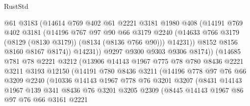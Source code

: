 \begin{lexlean}{RustStd}
\begin{coremodule}
                        @61
                        @3183
                        (@14614
                          @769
                          @402
                          @61
                          @2221
                          @3181
                          @1980
                          @408
                          (@14191
                            @769
                            @402
                            @3181
                            (@14196
                              @767
                              @97
                              @90
                              @66
                              @3179
                              @2240
                              (@14633 @766 @3179 (@8129 (@8130 @3179)) (@8134 (@8136 @766 @90)))
                              @14231))
                          @8152
                          @8156
                          @8160
                          @8167
                          @8174))
                      @14231))
                  @9297
                  @9300
                  @9303
                  @9306
                  @8174))
              (@14685
                @781
                @78
                @2221
                @3212
                (@13906
                  @14143
                  @1967
                  @775
                  @78
                  @780
                  @8436
                  @2221
                  @3211
                  @3193
                  @12150
                  (@14191
                    @780
                    @8436
                    @3211
                    (@14196
                      @778
                      @97
                      @76
                      @66
                      @3209
                      @2240
                      (@10336
                        @14143
                        @1967
                        @778
                        @76
                        @3201
                        @3207
                        (@8431
                          @14143
                          @1967
                          @139
                          @341
                          @8436
                          @76
                          @3201
                          @3205
                          @2309
                          (@8445
                            @14143
                            @1967
                            @86
                            @97
                            @76
                            @66
                            @3161
                            @2221

\end{coremodule}
\end{lexlean}
